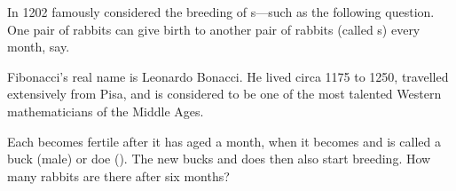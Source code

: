 \begin{reduce}
\begin{example}
In 1202 
%
 famously considered the breeding of s---such as the following question.
One pair of rabbits can give birth to another pair of rabbits (called s) every month, say.
\begin{aside}
Fibonacci's real name is Leonardo Bonacci. 
He lived circa 1175 to 1250, travelled extensively from Pisa, and is considered to be one of the most talented Western mathematicians of the Middle Ages.
\end{aside}%
Each  becomes fertile after it has aged a month, when it becomes  and is called a buck (male) or doe ().
The new bucks and does then also start breeding.
How many rabbits are there after six months?


\end{example}
\end{reduce}
